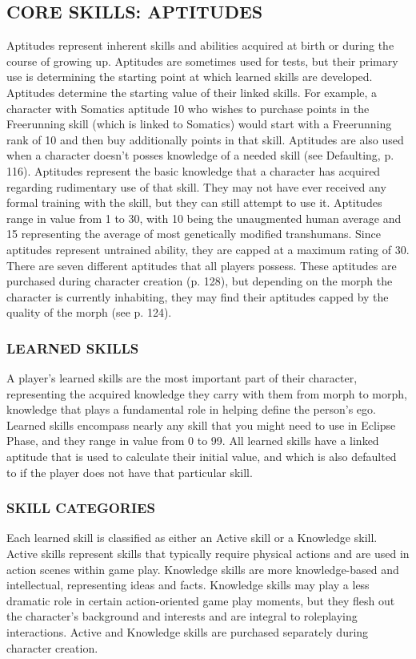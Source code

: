 \subsection{CORE SKILLS: APTITUDES} Aptitudes represent inherent skills and abilities acquired at birth or during the course of growing up. Aptitudes are sometimes used for tests, but their primary use is determining the starting point at which learned skills are developed. Aptitudes determine the starting value of their linked skills. For example, a character with Somatics aptitude 10 who wishes to purchase points in the Freerunning skill (which is linked to Somatics) would start with a Freerunning rank of 10 and then buy additionally points in that skill. Aptitudes are also used when a character doesn’t posses knowledge of a needed skill (see Defaulting, p. 116). Aptitudes represent the basic knowledge that a character has acquired regarding rudimentary use of that skill. They may not have ever received any formal training with the skill, but they can still attempt to use it. Aptitudes range in value from 1 to 30, with 10 being the unaugmented human average and 15 representing the average of most genetically modified transhumans. Since aptitudes represent untrained ability, they are capped at a maximum rating of 30. There are seven different aptitudes that all players possess. These aptitudes are purchased during character creation (p. 128), but depending on the morph the character is currently inhabiting, they may find their aptitudes capped by the quality of the morph (see p. 124). 

\subsubsection{LEARNED SKILLS} A player’s learned skills are the most important part of their character, representing the acquired knowledge they carry with them from morph to morph, knowledge that plays a fundamental role in helping define the person’s ego. Learned skills encompass nearly any skill that you might need to use in Eclipse Phase, and they range in value from 0 to 99. All learned skills have a linked aptitude that is used to calculate their initial value, and which is also defaulted to if the player does not have that particular skill. 



\subsubsection{SKILL CATEGORIES} Each learned skill is classified as either an Active skill or a Knowledge skill. Active skills represent skills that typically require physical actions and are used in action scenes within game play. Knowledge skills are more knowledge-based and intellectual, representing ideas and facts. Knowledge skills may play a less dramatic role in certain action-oriented game play moments, but they flesh out the character’s background and interests and are integral to roleplaying interactions. Active and Knowledge skills are purchased separately during character creation. 

